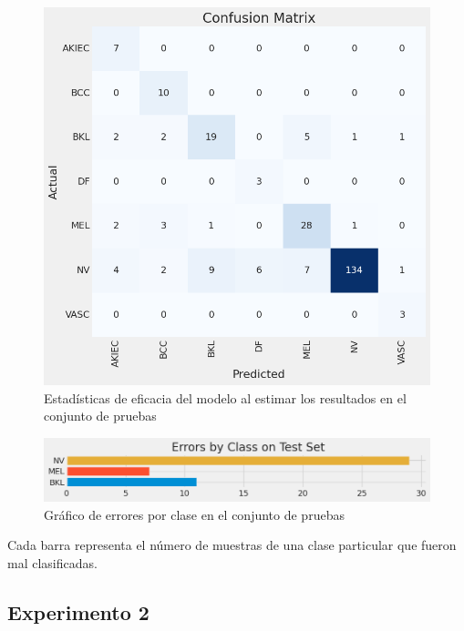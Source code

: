     \begin{figure}[ht]%
		\begin{center}
		\includegraphics[width=1\textwidth]{./Graphics/confussionmatrix_p1.png}
		\caption{Estadísticas de eficacia del modelo al estimar los resultados en el conjunto de pruebas\label{fig:confussion_matrix_p1}}
		\end{center}
		\end{figure}

      \begin{figure}[ht]%
         \begin{center}
         \includegraphics[width=1\textwidth]{./Graphics/errorByClass_p1.png}
         \caption{Gráfico de errores por clase en el conjunto de pruebas\label{fig:class_errors_p1}}
         \end{center}
         \end{figure}

         Cada barra representa el número de muestras de una clase particular que fueron mal clasificadas.
\subsection{Experimento 2}


